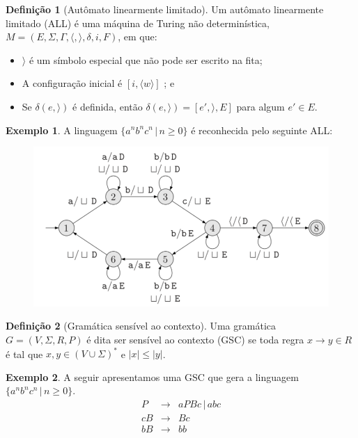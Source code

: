 \documentclass[a4paper]{article}
\theoremstyle{definition}
\newtheorem{Example}{Exemplo}
\newtheorem{Definition}{Definição}
\begin{document}
     \begin{Definition}[Autômato linearmente limitado]
       Um autômato linearmente limitado (ALL) é uma máquina de Turing não
       determinística, $M=(E,\Sigma,\Gamma,\langle,\rangle,\delta,i,F)$,
       em que:
       \begin{itemize}
         \item $\rangle$ é um símbolo especial que não pode ser escrito na fita;
         \item A configuração inicial é $[i,\langle w \rangle]$ ; e
         \item Se $\delta(e,\rangle)$ é definida, então $\delta(e,\rangle) =
           [e',\rangle,E]$ para algum $e' \in E$.
       \end{itemize}
     \end{Definition}

     \begin{Example}
       A linguagem $\{a^nb^nc^n\,|\,n \geq 0\}$ é reconhecida pelo seguinte ALL: 
       \begin{figure}[H]
         \includegraphics[scale=.3]{all.png}
         \centering
       \end{figure}
     \end{Example}

     \begin{Definition}[Gramática sensível ao contexto]
       Uma gramática $G = (V,\Sigma,R,P)$ é dita ser sensível ao contexto (GSC)
       se toda regra $x \to y \in R$ é tal que $x,y\in (V\cup\Sigma)^*$ e $|x|
       \leq |y|$.
     \end{Definition}

     \begin{Example}
       A seguir apresentamos uma GSC que gera a linguagem $\{a^nb^nc^n\,|\,n
       \geq 0\}$.
       \[
         \begin{array}{lcl}
           P & \to & aPBc \,|\,abc\\
           cB & \to & Bc \\
           bB & \to & bb\\
         \end{array}
       \]
     \end{Example}
\end{document}
